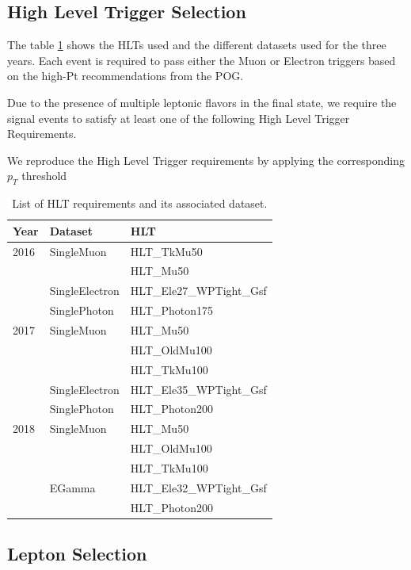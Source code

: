 \subsection{High Level Trigger Selection}

The table \ref{tab:HLTDatasets} shows the HLTs used and the different datasets used for the three years.
Each event is required to pass either the Muon or Electron triggers based on the high-Pt
recommendations from the POG.

Due to the presence of multiple leptonic flavors in the final state, we require
the signal events to satisfy at least one of the following High Level Trigger
Requirements.

We reproduce the High Level Trigger requirements by applying the corresponding
$p_T$ threshold



\begin{table}[h]
\centering
\caption{List of HLT requirements and its associated dataset.}
\begin{tabular}{|l|l|l|}
\hline
Year & Dataset & HLT                \\ \hline
2016 & SingleMuon     & HLT\_TkMu50 \\
     &                & HLT\_Mu50   \\
     & SingleElectron & HLT\_Ele27\_WPTight\_Gsf  \\
     & SinglePhoton   & HLT\_Photon175            \\ \hline
2017 & SingleMuon     & HLT\_Mu50       \\
     &                & HLT\_OldMu100   \\
     &                & HLT\_TkMu100    \\
     & SingleElectron & HLT\_Ele35\_WPTight\_Gsf  \\
     & SinglePhoton   & HLT\_Photon200            \\ \hline
2018 & SingleMuon & HLT\_Mu50     \\
     &            & HLT\_OldMu100 \\
     &            & HLT\_TkMu100  \\ \hline
     & EGamma     & HLT\_Ele32\_WPTight\_Gsf \\
     &            & HLT\_Photon200           \\ \hline
\end{tabular}
\label{tab:HLTDatasets}
\end{table}


\subsection{Lepton Selection}

